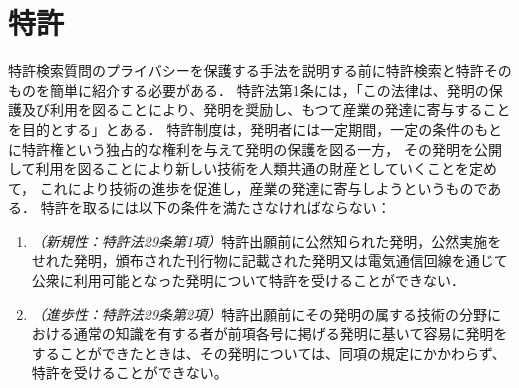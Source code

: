 \documentclass[master]{suribt}
\theoremstyle{definition}
\begin{document}
 \chapter{特許}
 特許検索質問のプライバシーを保護する手法を説明する前に特許検索と特許そのものを簡単に紹介する必要がある．
 特許法第1条には，「この法律は、発明の保護及び利用を図ることにより、発明を奨励し、もつて産業の発達に寄与することを目的とする」とある．
 特許制度は，発明者には一定期間，一定の条件のもとに特許権という独占的な権利を与えて発明の保護を図る一方，
 その発明を公開して利用を図ることにより新しい技術を人類共通の財産としていくことを定めて，
 これにより技術の進歩を促進し，産業の発達に寄与しようというものである．\cite{https://www.jpo.go.jp/seido/s_tokkyo/chizai04.htm}
 特許を取るには以下の条件を満たさなければならない：
 \begin{enumerate}
 \item {\em （新規性：特許法29条第1項）}特許出願前に公然知られた発明，公然実施をせれた発明，頒布された刊行物に記載された発明又は電気通信回線を通じて公衆に利用可能となった発明について特許を受けることができない．
 \item {\em （進歩性：特許法29条第2項）}特許出願前にその発明の属する技術の分野における通常の知識を有する者が前項各号に掲げる発明に基いて容易に発明をすることができたときは、その発明については、同項の規定にかかわらず、特許を受けることができない。
 \end{enumerate}
\end{document}
